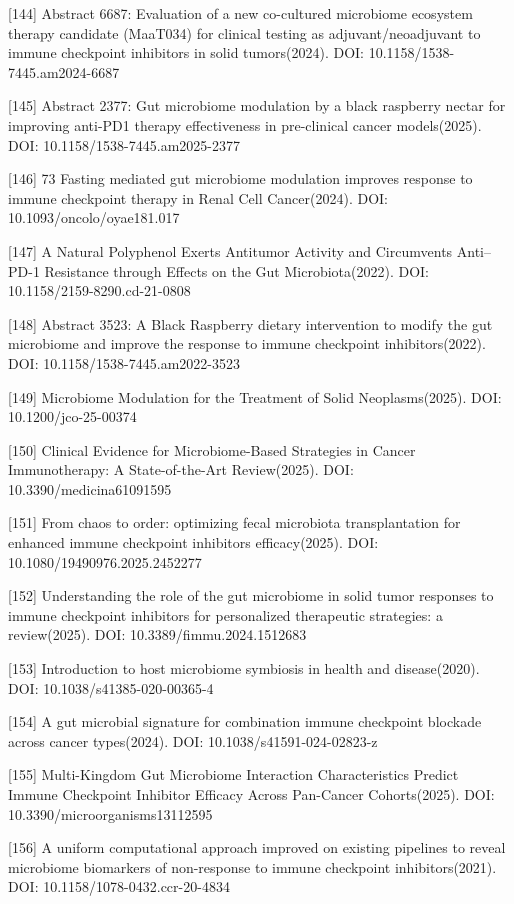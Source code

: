 {[}144{]} Abstract 6687: Evaluation of a new co-cultured microbiome ecosystem therapy candidate (MaaT034) for clinical testing as adjuvant/neoadjuvant to immune checkpoint inhibitors in solid tumors(2024). DOI: 10.1158/1538-7445.am2024-6687

{[}145{]} Abstract 2377: Gut microbiome modulation by a black raspberry nectar for improving anti-PD1 therapy effectiveness in pre-clinical cancer models(2025). DOI: 10.1158/1538-7445.am2025-2377

{[}146{]} 73 Fasting mediated gut microbiome modulation improves response to immune checkpoint therapy in Renal Cell Cancer(2024). DOI: 10.1093/oncolo/oyae181.017

{[}147{]} A Natural Polyphenol Exerts Antitumor Activity and Circumvents Anti--PD-1 Resistance through Effects on the Gut Microbiota(2022). DOI: 10.1158/2159-8290.cd-21-0808

{[}148{]} Abstract 3523: A Black Raspberry dietary intervention to modify the gut microbiome and improve the response to immune checkpoint inhibitors(2022). DOI: 10.1158/1538-7445.am2022-3523

{[}149{]} Microbiome Modulation for the Treatment of Solid Neoplasms(2025). DOI: 10.1200/jco-25-00374

{[}150{]} Clinical Evidence for Microbiome-Based Strategies in Cancer Immunotherapy: A State-of-the-Art Review(2025). DOI: 10.3390/medicina61091595

{[}151{]} From chaos to order: optimizing fecal microbiota transplantation for enhanced immune checkpoint inhibitors efficacy(2025). DOI: 10.1080/19490976.2025.2452277

{[}152{]} Understanding the role of the gut microbiome in solid tumor responses to immune checkpoint inhibitors for personalized therapeutic strategies: a review(2025). DOI: 10.3389/fimmu.2024.1512683

{[}153{]} Introduction to host microbiome symbiosis in health and disease(2020). DOI: 10.1038/s41385-020-00365-4

{[}154{]} A gut microbial signature for combination immune checkpoint blockade across cancer types(2024). DOI: 10.1038/s41591-024-02823-z

{[}155{]} Multi-Kingdom Gut Microbiome Interaction Characteristics Predict Immune Checkpoint Inhibitor Efficacy Across Pan-Cancer Cohorts(2025). DOI: 10.3390/microorganisms13112595

{[}156{]} A uniform computational approach improved on existing pipelines to reveal microbiome biomarkers of non-response to immune checkpoint inhibitors(2021). DOI: 10.1158/1078-0432.ccr-20-4834

